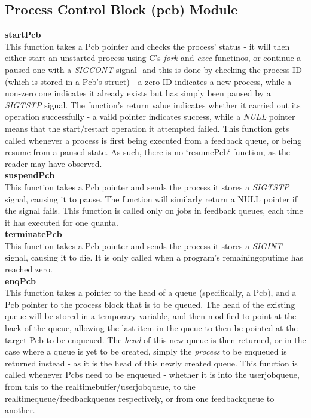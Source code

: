 \documentclass[11pt]{article}
\begin{document}
\subsection{Process Control Block (pcb) Module}
\textbf{startPcb}\\
This function takes a Pcb pointer and checks the process' status - it will then either start an unstarted process using C's \textit{fork} and \textit{exec} functinos, or continue a paused one with a \textit{SIGCONT} signal- and this is done by checking the process ID (which is stored in a Pcb's struct) - a zero ID indicates a new process, while a non-zero one indicates it already exists but has simply been paused by a \textit{SIGTSTP} signal. The function's return value indicates whether it carried out its operation successfully - a vaild pointer indicates success, while a \textit{NULL} pointer means that the start/restart operation it attempted failed. This function gets called whenever a process is first being executed from a feedback queue, or being resume from a paused state. As such, there is no `resumePcb` function, as the reader may have observed.\\

\textbf{suspendPcb}\\
This function takes a Pcb pointer and sends the process it stores a \textit{SIGTSTP} signal, causing it to pause. The function will similarly return a NULL pointer if the signal fails. This function is called only on jobs in feedback queues, each time it has executed for one quanta.\\

\textbf{terminatePcb}\\
This function takes a Pcb pointer and sends the process it stores a \textit{SIGINT} signal, causing it to die. It is only called when a program's remainingcputime has reached zero.\\

\textbf{enqPcb}\\
This function takes a pointer to the head of a queue (specifically, a Pcb), and a Pcb pointer to the process block that is to be queued. The head of the existing queue will be stored in a temporary variable, and then modified to point at the back of the queue, allowing the last item in the queue to then be pointed at the target Pcb to be enqueued. The \textit{head} of this new queue is then returned, or in the case where a queue is yet to be created, simply the \textit{process} to be enqueued is returned instead - as it is the head of this newly created queue. This function is called whenever Pcbs need to be enqueued - whether it is into the userjobqueue, from this to the realtimebuffer/userjobqueue, to the realtimequeue/feedbackqueues respectively, or from one feedbackqueue to another.\\
\end{document}
